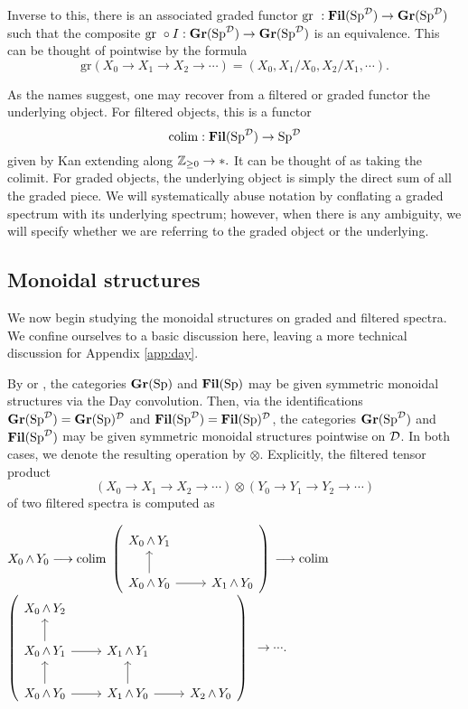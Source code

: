Inverse to this, there is an associated graded functor $\text{gr }: \operatorname{\mathbf{Fil}}(\operatorname{\mathrm{Sp}}^{\operatorname{\mathcal{D}}}) \to \operatorname{\mathbf{Gr}}(\operatorname{\mathrm{Sp}}^{\operatorname{\mathcal{D}}})$ such that the composite $\text{gr }\circ I : \operatorname{\mathbf{Gr}}(\operatorname{\mathrm{Sp}}^{\operatorname{\mathcal{D}}}) \to \operatorname{\mathbf{Gr}}(\operatorname{\mathrm{Sp}}^{\operatorname{\mathcal{D}}})$ is an equivalence.   This can be thought of pointwise by the formula $$\text{gr}(X_0\to X_1\to X_2\to \cdots) = (X_0, X_1/X_0, X_2/X_1, \cdots).$$

As the names suggest, one may recover from a filtered or graded functor the underlying object.  For filtered objects, this is a functor $$\operatorname*{\mathrm{colim}} : \operatorname{\mathbf{Fil}}(\operatorname{\mathrm{Sp}}^{\operatorname{\mathcal{D}}}) \to \operatorname{\mathrm{Sp}}^{\operatorname{\mathcal{D}}}$$ given by Kan extending along $\operatorname{\mathbb{Z}}_{\geq 0}\to *.$   It can be thought of as taking the colimit.  For graded objects, the underlying object is simply the direct sum of all the graded piece. We will systematically abuse notation by conflating a graded spectrum with its underlying spectrum; however, when there is any ambiguity, we will specify whether we are referring to the graded object or the underlying.




\subsection{Monoidal structures}\label{sect:monoidal}
We now begin studying the monoidal structures on graded and filtered spectra.  We confine ourselves to a basic discussion here, leaving a more technical discussion for Appendix \ref{app:day}.

By \cite{Glasman} or \cite[Example 2.2.6.17]{HA}, the categories $\operatorname{\mathbf{Gr}}(\operatorname{\mathrm{Sp}})$ and $\operatorname{\mathbf{Fil}}(\operatorname{\mathrm{Sp}})$ may be given symmetric monoidal structures via the Day convolution.  Then, via the identifications $\operatorname{\mathbf{Gr}}(\operatorname{\mathrm{Sp}}^{\operatorname{\mathcal{D}}}) = \operatorname{\mathbf{Gr}}(\operatorname{\mathrm{Sp}})^{\operatorname{\mathcal{D}}}$ and $\operatorname{\mathbf{Fil}}(\operatorname{\mathrm{Sp}}^{\operatorname{\mathcal{D}}}) = \operatorname{\mathbf{Fil}}(\operatorname{\mathrm{Sp}})^{\operatorname{\mathcal{D}}}$, the categories $\operatorname{\mathbf{Gr}}(\operatorname{\mathrm{Sp}}^{\operatorname{\mathcal{D}}})$ and $\operatorname{\mathbf{Fil}}(\operatorname{\mathrm{Sp}}^{\operatorname{\mathcal{D}}})$ may be given symmetric monoidal structures pointwise on $\operatorname{\mathcal{D}}$.  In both cases, we denote the resulting operation by $\otimes$. Explicitly, the filtered tensor product $$\left(X_0 \longrightarrow X_1 \longrightarrow X_2 \longrightarrow \cdots \right) \otimes \left(Y_0 \longrightarrow Y_1 \longrightarrow Y_2 \longrightarrow \cdots \right)$$
of two filtered spectra is computed as

\begin{center}
$X_0 \operatorname{\wedge} Y_0 \longrightarrow \operatorname*{\mathrm{colim}} $
{$ \left(\begin{tikzcd} X_0 \smsh Y_1 \\  X_0 \smsh Y_0 \arrow{u} \arrow{r} & X_1 \smsh Y_0 \end{tikzcd} \right) $} 
$\longrightarrow \operatorname*{\mathrm{colim}}$
 {$ \left( \begin{tikzcd} X_0 \smsh Y_2 \\ X_0 \smsh Y_1 \arrow{r} \arrow{u} & X_1 \smsh Y_1  \\ X_0 \smsh Y_0 \arrow{r} \arrow{u} & X_1 \smsh Y_0 \arrow{u} \arrow{r} & X_2 \smsh Y_0 \end{tikzcd} \right) $}
$\longrightarrow \cdots.$
\end{center}

